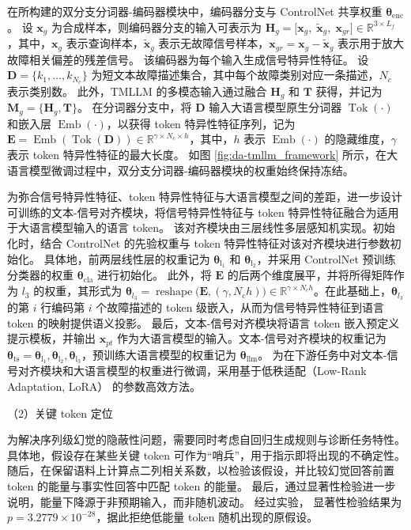 在所构建的双分支分词器-编码器模块中，编码器分支与 ControlNet 共享权重 $\bm{\theta}_\mathrm{enc}$。
设 $\bm{x}_{g}$ 为合成样本，则编码器分支的输入可表示为 $\bm{H}_{g} = \bigl[\bm{x}_{g},\;\tilde{\bm{x}}_{g},\;\bm{x}_{gr}\bigr] \in \mathbb{R}^{3 \times L_{f}}$，其中，$\bm{x}_{g}$ 表示查询样本，$\tilde{\bm{x}}_{g}$ 表示无故障信号样本，$\bm{x}_{gr}=\bm{x}_{g}-\tilde{\bm{x}}_{g}$ 表示用于放大故障相关偏差的残差信号。
该编码器为每个输入生成信号特异性特征。
设 $\bm{D}=\{k_{1},\dots,k_{N_c}\}$ 为短文本故障描述集合，其中每个故障类别对应一条描述，$N_c$ 表示类别数。
此外，TMLLM 的多模态输入通过融合 $\bm{H}_{g}$ 和 $\bm{T}$ 获得，并记为 $\bm{M}_{g}=\{\bm{H}_{g},\bm{T}\}$。
在分词器分支中，将 $\bm{D}$ 输入大语言模型原生分词器 $\operatorname{Tok}(\cdot)$ 和嵌入层 $\operatorname{Emb}(\cdot)$，以获得 token 特异性特征序列，记为 $\bm{E}=\operatorname{Emb}(\operatorname{Tok}(\bm{D})) \in \mathbb{R}^{\gamma\times N_c\times h}$，其中，$h$ 表示 $\operatorname{Emb}(\cdot)$ 的隐藏维度，$\gamma$ 表示 token 特异性特征的最大长度。
如图 \ref{fig:da-tmllm_framework} 所示，在大语言模型微调过程中，双分支分词器-编码器模块的权重始终保持冻结。

为弥合信号特异性特征、token 特异性特征与大语言模型之间的差距，进一步设计可训练的文本-信号对齐模块，将信号特异性特征与 token 特异性特征融合为适用于大语言模型输入的语言 token。
该对齐模块由三层线性多层感知机实现。初始化时，结合 ControlNet 的先验权重与 token 特异性特征对该对齐模块进行参数初始化。
具体地，前两层线性层的权重记为 $\bm{\theta}_\mathrm{l_{1}}$ 和 $\bm{\theta}_\mathrm{l_{2}}$，并采用 ControlNet 预训练分类器的权重 $\bm{\theta}_\mathrm{cla}$ 进行初始化。
此外，将 $\bm{E}$ 的后两个维度展平，并将所得矩阵作为 $l_{3}$ 的权重，其形式为 $\boldsymbol{\theta}_{l_{3}} =\operatorname{reshape}\bigl(\bm{E},(\gamma,N_c h)\bigr)
\in\mathbb{R}^{\gamma\times N_c h}$。在此基础上，$\boldsymbol{\theta}_{l_{3}}$ 的第 $i$ 行编码第 $i$ 个故障描述的 token 级嵌入，从而为信号特异性特征到语言 token 的映射提供语义投影。
最后，文本-信号对齐模块将语言 token 嵌入预定义提示模板，并输出 $\bm{x}_{pt}$ 作为大语言模型的输入。文本-信号对齐模块的权重记为 $\boldsymbol{\theta}_\mathrm{ts}={\bm{\theta}_\mathrm{l_{1}}, \bm{\theta}_\mathrm{l_{2}}, \bm{\theta}_\mathrm{l_{3}}}$，预训练大语言模型的权重记为 $\boldsymbol{\theta}_\mathrm{llm}$。
为在下游任务中对文本-信号对齐模块和大语言模型的权重进行微调，采用基于低秩适配（Low-Rank Adaptation, LoRA） \cite{20231213775448} 的参数高效方法。

（2）关键 token 定位

为解决序列级幻觉的隐蔽性问题，需要同时考虑自回归生成规则与诊断任务特性。
具体地，假设存在某些关键 token 可作为“哨兵”，用于指示即将出现的不确定性。
随后，在保留语料上计算点二列相关系数，以检验该假设，并比较幻觉回答前置 token 的能量与事实性回答中匹配 token 的能量。
最后，通过显著性检验进一步说明，能量下降源于非预期输入，而非随机波动。
经过实验，
显著性检验结果为 $p=3.2779\times10^{-28}$，据此拒绝低能量 token 随机出现的原假设。

